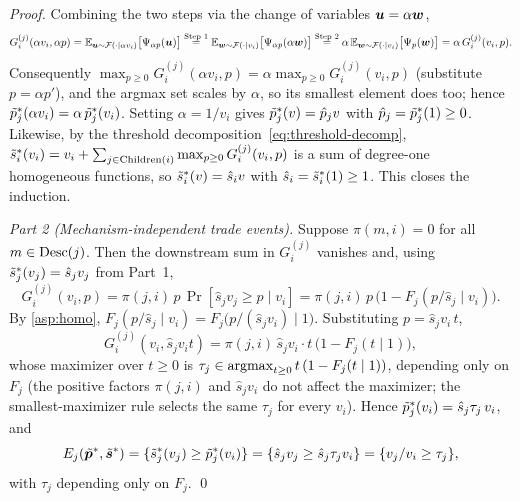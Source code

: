 \begin{proof}
Combining the two steps via the change of variables ${\bm{u}} = \alpha{\bm{w}}$,
\[
G^{(j)}_i(\alpha v_i, \alpha p)
= \mathbb{E}_{{\bm{u}} \sim \mathcal{F}(\cdot \mid \alpha v_i)}\big[\Psi_{\alpha p}({\bm{u}})\big]
\overset{\text{Step 1}}{=} \mathbb{E}_{{\bm{w}} \sim \mathcal{F}(\cdot \mid v_i)}\big[\Psi_{\alpha p}(\alpha{\bm{w}})\big]
\overset{\text{Step 2}}{=} \alpha\,\mathbb{E}_{{\bm{w}} \sim \mathcal{F}(\cdot \mid v_i)}\big[\Psi_p({\bm{w}})\big]
= \alpha\, G^{(j)}_i(v_i, p).
\]
Consequently $\max_{p \ge 0} G^{(j)}_i(\alpha v_i, p) = \alpha \max_{p \ge 0} G^{(j)}_i(v_i, p)$ (substitute $p = \alpha p'$), and the argmax set scales by $\alpha$, so its smallest element does too; hence $\tilde{p}^*_j(\alpha v_i) = \alpha\, \tilde{p}^*_j(v_i)$. Setting $\alpha = 1/v_i$ gives $\tilde{p}^*_j(v) = \hat{p}_j v$ with $\hat{p}_j = \tilde{p}^*_j(1) \ge 0$. Likewise, by the threshold decomposition~\eqref{eq:threshold-decomp}, $\tilde{s}^*_i(v_i) = v_i + \sum_{j \in \operatorname{Children}(i)} \max_{p \ge 0} G^{(j)}_i(v_i, p)$ is a sum of degree-one homogeneous functions, so $\tilde{s}^*_i(v) = \hat{s}_i v$ with $\hat{s}_i = \tilde{s}^*_i(1) \ge 1$. This closes the induction.

\smallskip\noindent\textit{Part 2 (Mechanism-independent trade events).}\enspace
Suppose $\pi(m,i) = 0$ for all $m \in \operatorname{Desc}(j)$. Then the downstream sum in $G^{(j)}_i$ vanishes and, using $\tilde{s}^*_j(v_j) = \hat{s}_j v_j$ from Part~1,
\[
G^{(j)}_i(v_i, p) = \pi(j,i)\, p \, \Pr[\hat{s}_j v_j \ge p \mid v_i] = \pi(j,i)\, p\, \big(1 - F_j(p/\hat{s}_j \mid v_i)\big).
\]
By \cref{asp:homo}, $F_j(p/\hat{s}_j \mid v_i) = F_j\big(p/(\hat{s}_j v_i) \mid 1\big)$. Substituting $p = \hat{s}_j v_i\, t$,
\[
G^{(j)}_i(v_i, \hat{s}_j v_i t) = \pi(j,i)\, \hat{s}_j v_i \cdot t\,\big(1 - F_j(t \mid 1)\big),
\]
whose maximizer over $t \ge 0$ is $\tau_j \in \operatorname*{argmax}_{t \ge 0} t\,(1 - F_j(t \mid 1))$, depending only on $F_j$ (the positive factors $\pi(j,i)$ and $\hat{s}_j v_i$ do not affect the maximizer; the smallest-maximizer rule selects the same $\tau_j$ for every $v_i$). Hence $\tilde{p}^*_j(v_i) = \hat{s}_j \tau_j\, v_i$, and
\[
E_j(\tilde{{\bm{p}}}^*, \tilde{{\bm{s}}}^*) = \{\tilde{s}^*_j(v_j) \ge \tilde{p}^*_j(v_i)\} = \{\hat{s}_j v_j \ge \hat{s}_j \tau_j v_i\} = \{v_j / v_i \ge \tau_j\},
\]
with $\tau_j$ depending only on $F_j$.
\qed
\end{proof}
